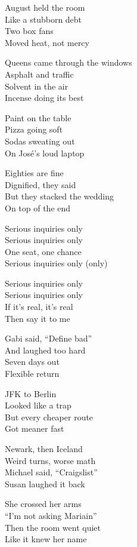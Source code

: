\begin{lyrics}
August held the room\\
Like a stubborn debt\\
Two box fans\\
Moved heat, not mercy

Queens came through the windows\\
Asphalt and traffic\\
Solvent in the air\\
Incense doing its best

Paint on the table\\
Pizza going soft\\
Sodas sweating out\\
On José’s loud laptop

Eighties are fine\\
Dignified, they said\\
But they stacked the wedding\\
On top of the end

Serious inquiries only\\
Serious inquiries only\\
One seat, one chance\\
Serious inquiries only (only)

Serious inquiries only\\
Serious inquiries only\\
If it’s real, it’s real\\
Then say it to me

Gabi said, “Define bad”\\
And laughed too hard\\
Seven days out\\
Flexible return

JFK to Berlin\\
Looked like a trap\\
But every cheaper route\\
Got meaner fast

Newark, then Iceland\\
Weird turns, worse math\\
Michael said, “Craigslist”\\
Susan laughed it back

She crossed her arms\\
“I’m not asking Mariain”\\
Then the room went quiet\\
Like it knew her name


\end{lyrics}
